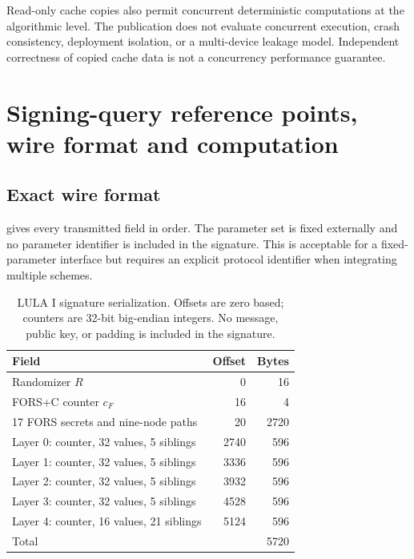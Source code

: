 \documentclass[a4paper,envcountsame,runningheads]{llncs}
\begin{document}
Read-only cache copies also permit concurrent deterministic computations at the algorithmic level. The publication does not evaluate concurrent execution, crash consistency, deployment isolation, or a multi-device leakage model. Independent correctness of copied cache data is not a concurrency performance guarantee.

\section{Signing-query reference points, wire format and computation}\label{sec:cost}

\FloatBarrier

\subsection{Exact wire format}
 gives every transmitted field in order. The parameter set is fixed externally and no parameter identifier is included in the signature. This is acceptable for a fixed-parameter interface but requires an explicit protocol identifier when integrating multiple schemes.

\begin{table}[t]
\caption{LULA I signature serialization. Offsets are zero based; counters are 32-bit big-endian integers. No message, public key, or padding is included in the signature.}\label{tab:wire}
\centering\small
\begin{tabular}{P{49mm}rr}\toprule
Field & Offset & Bytes\\\midrule
Randomizer $R$ &0&16\\
FORS+C counter $c_F$ &16&4\\
17 FORS secrets and nine-node paths &20&2720\\
Layer 0: counter, 32 values, 5 siblings &2740&596\\
Layer 1: counter, 32 values, 5 siblings &3336&596\\
Layer 2: counter, 32 values, 5 siblings &3932&596\\
Layer 3: counter, 32 values, 5 siblings &4528&596\\
Layer 4: counter, 16 values, 21 siblings &5124&596\\\midrule
Total &&5720\\\bottomrule
\end{tabular}
\end{table}
\end{document}
